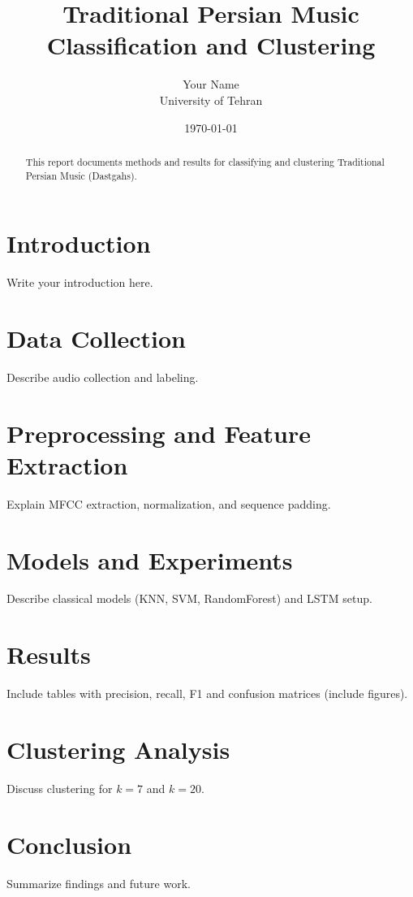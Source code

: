 \documentclass[11pt]{article}
\title{Traditional Persian Music Classification and Clustering}
\author{Your Name \\ University of Tehran}
\date{\today}
\begin{document}
\maketitle
\begin{abstract}
This report documents methods and results for classifying and clustering Traditional Persian Music (Dastgahs).
\end{abstract}

\section{Introduction}
Write your introduction here.

\section{Data Collection}
Describe audio collection and labeling.

\section{Preprocessing and Feature Extraction}
Explain MFCC extraction, normalization, and sequence padding.

\section{Models and Experiments}
Describe classical models (KNN, SVM, RandomForest) and LSTM setup.

\section{Results}
Include tables with precision, recall, F1 and confusion matrices (include figures).

\section{Clustering Analysis}
Discuss clustering for $k=7$ and $k=20$.

\section{Conclusion}
Summarize findings and future work.
\end{document}
